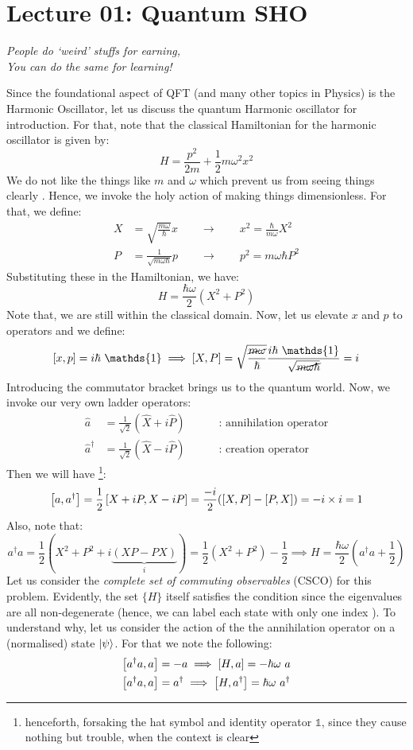 \section*{Lecture 01: Quantum SHO}
\begin{center}
    \textit{People do `weird' stuffs for earning,\\
    You can do the same for learning!}
\end{center}
Since the foundational aspect of QFT (and many other topics in Physics) is the Harmonic Oscillator, let us discuss the quantum Harmonic oscillator for introduction. For that, note that the classical Hamiltonian for the harmonic oscillator is given by:
$$H = \frac{p^2}{2m}+\frac{1}{2}m\omega^2x^2 $$
We do not like the things like $m$ and $\omega$ which prevent us from seeing things clearly . Hence, we invoke the holy action of making things dimensionless. For that, we define:
\begin{align*}
    X &= \sqrt{\frac{m\omega}{\hbar}}x \qquad \longrightarrow\qquad x^2 = \frac{\hbar}{m\omega}X^2  \\
    P &=\frac{1}{\sqrt{m\omega\hbar}}p \qquad \longrightarrow\qquad p^2 = m\omega \hbar P^2
\end{align*}
Substituting these in the Hamiltonian, we have: 
$$H = \frac{\hbar\omega}{2}(X^2+P^2)$$
Note that, we are still within the classical domain. Now, let us elevate $x$ and $p$ to operators and we define:
$$\comtr{x}{p}=i\hbar\ \mathds{1} \implies \comtr{X}{P} =\sqrt{ \frac{\cancel{m\omega}}{{\hbar}}}\frac{i\hbar \ \mathds{1}}{\sqrt{\cancel{m\omega\hbar}}} = i$$
Introducing the commutator bracket brings us to the quantum world. Now, we invoke our very own ladder operators:
\begin{align*}
    \hat{a} &= \frac{1}{\sqrt{2}}(\hat{X}+ i\hat{P})\qquad \quad \text{: annihilation operator}\\
    \hat{a}^{\dagger} &= \frac{1}{\sqrt{2}}(\hat{X}- i\hat{P})\qquad \quad \text{: creation operator}
\end{align*}
Then we will have \footnote{henceforth, forsaking the hat symbol and identity operator $\mathds{1}$, since they cause nothing but trouble, when the context is clear}:
$$\left[ a, a^\dagger \right] = \frac{1}{2}\left[ X +iP, X-iP \right] = \frac{-i}{2}\qty(\left[ X, P \right]-\left[ P, X \right]) = -i\times i = 1$$
Also, note that:
$$a^\dagger a = \frac{1}{2}(X^2+P^2+i\underbrace{(XP-PX)}_{i})= \frac{1}{2}(X^2+P^2)-\frac{1}{2}\implies H = \frac{\hbar\omega}{2}(a^\dagger a +\frac{1}{2})$$
Let us consider the \textit{complete set of commuting observables} (CSCO) for this problem. Evidently, the set $\{H\}$ itself satisfies the condition since the eigenvalues are all non-degenerate (hence, we can label each state with only one index ). To understand why, let us consider the action of the the annihilation operator on a (normalised) state $\ket{\psi}$. For that we note the following:
\begin{align*}
    \left[ a^\dagger a, a \right] &= -a \implies \left[ H, a \right] = -\hbar\omega \ a\\
\left[ a^\dagger a, a \right] &= a^\dagger \implies \left[ H, a^\dagger \right] = \hbar\omega \ a^\dagger
\end{align*}

